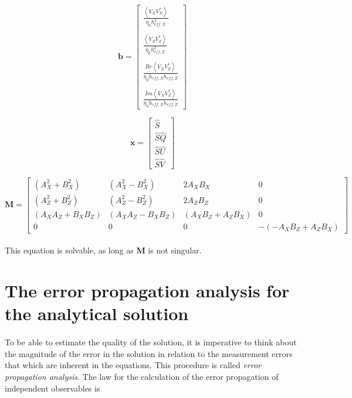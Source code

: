 \documentclass[a4paper,10pt]{thesis}
\begin{document}
\begin{equation}
\textbf{b}=\left[ \begin{array}{c}
\frac{\left\langle V_X V_X^{*} \right\rangle }{\eta_0 h_{eff,X}^2} \\ \\
 \frac{\left\langle V_Z V_Z^{*} \right\rangle }{\eta_0 h_{eff,Z}^2}\\ \\
\frac{Re \left\langle V_X V_Z^{*}\right\rangle }{\eta_0 h_{eff,X} h_{eff,Z}} \\ \\
\frac{Im \left\langle V_X V_Z^{*}\right\rangle }{\eta_0 h_{eff,X} h_{eff,Z}}
\end{array}  \right]
\end{equation}

\begin{equation}
\textbf{x}=\left[ \begin{array}{c}
\hat{S}\\
\hat{S}\hat{Q}\\
\hat{S}\hat{U}\\
\hat{S}\hat{V}
\end{array}  \right]
\end{equation}

\tiny
\begin{equation}
\textbf{M}= \left[
\begin{array}{cccc}
(A^2_X+ B^2_X) & (A^2_X- B^2_X) & 2 A_X B_X & 0 \\
(A^2_Z+ B^2_Z) &(A^2_Z- B^2_Z)  & 2 A_Z B_Z & 0 \\
 (A_X A_Z +  B_X B_Z)& (A_X A_Z - B_X B_Z) & (A_X B_Z + A_Z B_X) & 0 \\
0 & 0 & 0 & -(-A_X B_Z + A_Z B_X )
\end{array} \right]
\end{equation}
\normalsize

\paragraph*{}
This equation is solvable, as long as \textbf{M} is not singular.

\section{\textbf{The error propagation analysis for the analytical solution}}
\paragraph*{}
To be able to estimate the quality of the solution, it is imperative to think about the magnitude of the error in the solution in relation to the measurement errors that which are inherent in the equations. This procedure is called \textit{error propagation analysis}. The law for the calculation of the error propagation of independent observables is
\end{document}
